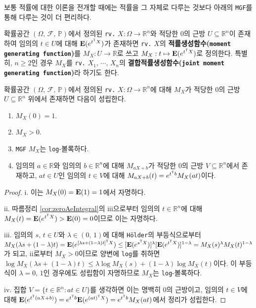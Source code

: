 보통 적률에 대한 이론을 전개할 때에는 적률을 그 자체로 다루는 것보다 아래의 \texttt{MGF}를 통해 다루는 것이 더 편리하다.

\begin{definition}
    확률공간 $(\Omega,\,\mathcal{F},\,\mathbb{P})$에서 정의된 \texttt{rv.} $X:\Omega\to\mathbb{R}^n$와 적당한 $0$의 근방 $U\subseteq\mathbb{R}^n$이 존재하여 임의의 $t\in U$에 대해 $\mathbf{E}(e^{t^{\mathsf{T}} X})$가 존재하면 \texttt{rv.} $X$의 \textbf{적률생성함수(\texttt{moment generating function})}를 $M_X:U\to\mathbb{R}$로 쓰고 $M_X:t\mapsto\mathbf{E}(e^{t^{\mathsf{T}} X})$로 정의한다. 특별히, $n\geq2$인 경우 $M_X$를 \texttt{rv.} $X_1,\,\cdots,\,X_n$의 \textbf{결합적률생성함수(\texttt{joint moment generating function})}라 하기도 한다.
\end{definition}

\begin{theorem}\label{thm:MGFProp}
    확률공간 $(\Omega,\,\mathcal{F},\,\mathbb{P})$에서 정의된 \texttt{rv.} $X:\Omega\to\mathbb{R}^n$에 대해 $M_X$가 적당한 $0$의 근방 $U\subseteq\mathbb{R}^n$ 위에서 존재하면 다음이 성립한다.
    \begin{enumerate}
        \item $M_X(0)=1$.
        \item $M_X>0$.
        \item \texttt{MGF} $M_X$는 \texttt{log}-볼록하다.
        \item 임의의 $a\in\mathbb{R}$와 임의의 $b\in\mathbb{R}^n$에 대해 $M_{aX+b}$가 적당한 $0$의 근방 $V\subseteq\mathbb{R}^n$에서 존재하고, $at\in U$인 임의의 $t\in V$에 대해 $M_{aX+b}(t)=e^{t^{\mathsf{T}} b}M_X(at)$이다.
    \end{enumerate}
\end{theorem}

\begin{proof}
    i. 이는 $M_X(0)=\mathbf{E}(1)=1$에서 자명하다.

    ii. 따름정리 \ref{cor:zeroAeIntegral}의 iii으로부터 임의의 $t\in\mathbb{R}^n$에 대해 $M_X(t)=\mathbf{E}(e^{t^{\mathsf{T}} X})>\mathbf{E}(0)=0$이므로 이는 자명하다.

    iii. 임의의 $s,\,t\in U$와 $\lambda\in(0,\,1)$에 대해 \texttt{H\"older}의 부등식으로부터 $M_X(\lambda s+(1-\lambda)t)=\mathbf{E}(e^{[\lambda s+(1-\lambda)t]^{\mathsf{T}} X})\leq[\mathbf{E}(e^{s^{\mathsf{T}} X})]^\lambda[\mathbf{E}(e^{t^{\mathsf{T}} X})]^{1-\lambda}=M_X(s)^\lambda M_X(t)^{1-\lambda}$가 되고, ii로부터 $M_X>0$이므로 양변에 \texttt{log}를 취하면 $\log M_X(\lambda s+(1-\lambda)t)\leq\lambda\log M_X(s)+(1-\lambda)\log M_X(t)$이다. 이 부등식이 $\lambda=0,\,1$인 경우에도 성립함이 자명하므로 $M_X$는 \texttt{log}-볼록하다.

    iv. 집합 $V=\{t\in\mathbb{R}^n:at\in U\}$를 생각하면 이는 명백히 $0$의 근방이고, 임의의 $t\in V$에 대해 $\mathbf{E}(e^{t^{\mathsf{T}}(aX+b)})=e^{t^{\mathsf{T}} b}\mathbf{E}(e^{(at)^{\mathsf{T}} X})=e^{t^{\mathsf{T}} b}M_X(at)$에서 정리가 성립한다.
\end{proof}

